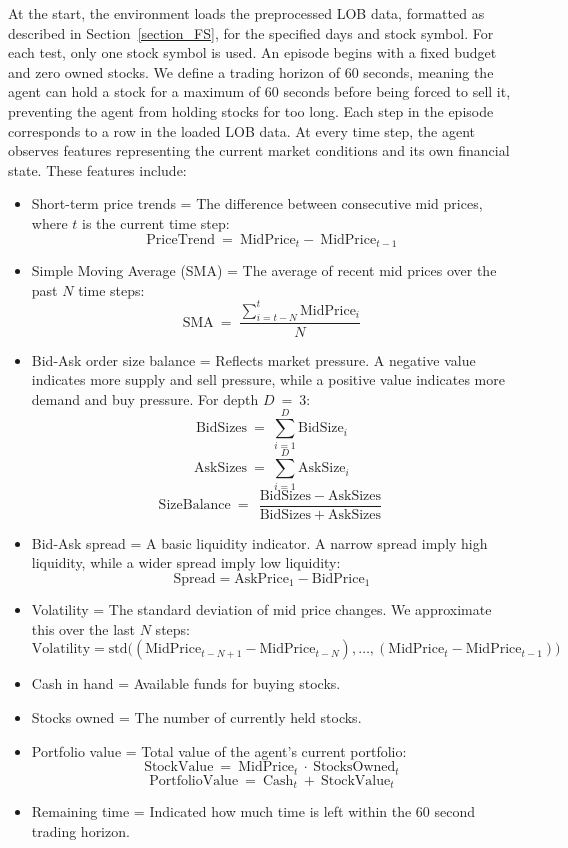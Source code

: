 \documentclass[a4paper,oneside,onecolumn,12pt]{book}
\begin{document}
	At the start, the environment loads the preprocessed LOB data, formatted as described in Section~\ref{section_FS}, for the specified days and stock symbol. For each test, only one stock symbol is used. An episode begins with a fixed budget and zero owned stocks. We define a trading horizon of 60 seconds, meaning the agent can hold a stock for a maximum of 60 seconds before being forced to sell it, preventing the agent from holding stocks for too long. Each step in the episode corresponds to a row in the loaded LOB data. At every time step, the agent observes features representing the current market conditions and its own financial state. These features include:
	\begin{itemize}
		\item Short-term price trends = The difference between consecutive mid prices, where $t$ is the current time step: 
			\[ \text{PriceTrend}\ =\ \text{MidPrice}_{t} -\ \text{MidPrice}_{t-1} \]
		\item Simple Moving Average (SMA) = The average of recent mid prices over the past $N$ time steps:
			\[ \text{SMA}\ =\ \frac{\sum_{i=t-N}^{t}{\text{MidPrice}_{i}}}{N} \]
		\item Bid-Ask order size balance = Reflects market pressure. A negative value indicates more supply and sell pressure, while a positive value indicates more demand and buy pressure. For depth $D\ =\ 3$:
			\[ \text{BidSizes}\ =\ \sum_{i=1}^{D}{\text{BidSize}_i} \]
			\[ \text{AskSizes}\ =\ \sum_{i=1}^{D}{\text{AskSize}_i} \]
			\[ \text{SizeBalance}\ =\ \frac{\text{BidSizes}\ -\ \text{AskSizes}}{\text{BidSizes}\ +\ \text{AskSizes}}\]
		\item Bid-Ask spread = A basic liquidity indicator. A narrow spread imply high liquidity, while a wider spread imply low liquidity:
			\[ \text{Spread} = \text{AskPrice}_{1} - \text{BidPrice}_{1} \]
		\item Volatility = The standard deviation of mid price changes. We approximate this over the last $N$ steps:
			\[ \text{Volatility} = \mathrm{std}\big( (\text{MidPrice}_{t-N+1} - \text{MidPrice}_{t-N}), \ldots, (\text{MidPrice}_{t} - \text{MidPrice}_{t-1}) \big) \]
		\item Cash in hand = Available funds for buying stocks.
		\item Stocks owned = The number of currently held stocks.
		\item Portfolio value = Total value of the agent's current portfolio:
			\[ \text{StockValue}\ =\ \text{MidPrice}_{t}\ \cdot\ \text{StocksOwned}_{t} \]
			\[ \text{PortfolioValue}\ =\ \text{Cash}_{t}\ +\ \text{StockValue}_{t} \]
		\item Remaining time = Indicated how much time is left within the 60 second trading horizon.
	\end{itemize}
\end{document}
